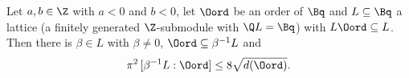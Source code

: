 Let $a,b\in\Z$ with $a<0$ and $b<0$, let $\Oord$ be an order of $\Bq$ and $L\subseteq\Bq$ a lattice (a finitely generated $\Z$-submodule with $\Q L=\Bq$) with
$L\Oord\subseteq L$. Then there is $\beta\in L$ with $\beta\ne0$, $\Oord\subseteq\beta^{-1}L$ and
\[
  \pi^2\,[\beta^{-1}L:\Oord]\le8\sqrt{d(\Oord)}.
\]
